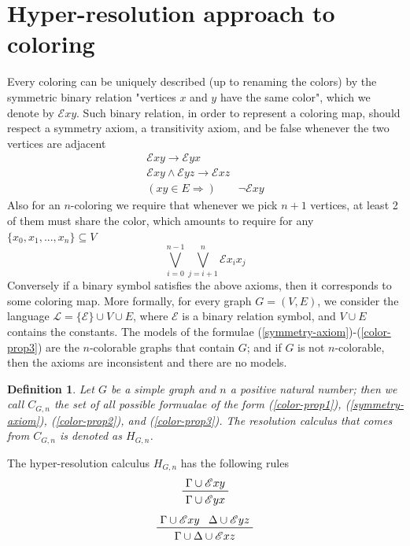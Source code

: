 \documentclass[a4paper,12pt,oneside]{book}
\newtheorem{definition}[theorem]{Definition}
\newcommand{\E}{\mathscr{E}}
\begin{document}
\section{Hyper-resolution approach to coloring}
Every coloring can be uniquely described (up to renaming the colors) by the symmetric binary relation "vertices $x$ and $y$ have the same color", which we denote by  $\E xy$. 
Such binary relation, in order to represent a coloring map, should respect a symmetry axiom, a transitivity axiom, and be false whenever the two vertices are adjacent 
\begin{gather}
\E xy \rightarrow \E yx \label{symmetry-axiom}\\
\E xy \wedge \E yz \rightarrow  \E xz \label{color-prop1}\\
( xy \in E \Rightarrow ) \qquad  \neg \E xy \label{color-prop2}
\end{gather}
Also for an $n$-coloring we require that whenever we pick $n+1$ vertices, at least 2 of them must share the color, which amounts to require for any $\{ x_0, x_1, ... , x_n \} \subseteq  V$
\begin{equation} \label{color-prop3}
\bigvee_{i=0}^{n-1} \bigvee_{j=i+1}^{n} \E x_i x_j
\end{equation}
Conversely if a binary symbol satisfies the above axioms, then it corresponds to some coloring map. More formally, for every graph $G=(V,E)$, we consider the language $\mathscr{L}=\{\E\}\cup V\cup E$, where $\E$ is a binary relation symbol, and $V\cup E$ contains the constants. The models of the formulae (\ref{symmetry-axiom})-(\ref{color-prop3}) are the $n$-colorable graphs that contain $G$; and if $G$ is not $n$-colorable, then  the axioms are inconsistent and there are no models. 
\begin{definition}
Let $G$ be a simple graph and $n$ a positive natural number; then we call $C_{G,n}$ the set of all possible formualae of the form (\ref{color-prop1}), (\ref{symmetry-axiom}), (\ref{color-prop2}), and (\ref{color-prop3}). The resolution calculus that comes from $C_{G,n}$ is denoted as $H_{G,n}$.
\end{definition}
The hyper-resolution calculus $H_{G,n}$ has the following rules
\begin{equation}
\label{symm}
\prftree{\Gamma \cup \E xy }{ \Gamma\cup \E yx }
\end{equation}
\begin{equation}
\label{trans}
 \prftree{\Gamma \cup \E xy }{\Delta \cup \E yz }{\Gamma \cup \Delta \cup \E xz }
\end{equation}
\end{document}
